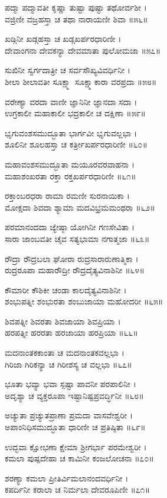 ಪದ್ಮಾ ಪದ್ಮಾವತೀ ಕೃಷ್ಣಾ ತುಷ್ಟಾ ಪುಷ್ಟಾ ತಥೋರ್ವಶೀ ।\\
ವಜ್ರಿಣೀ ವಜ್ರಹಸ್ತಾ ಚ ತಥಾ ನಾರಾಯಣೀ ಶಿವಾ ॥೫೬॥

ಖಡ್ಗಿನೀ ಖಡ್ಗಹಸ್ತಾ ಚ ಖಡ್ಗಖರ್ಪರಧಾರಿಣೀ ।\\
ದೇವಾಂಗನಾ ದೇವಕನ್ಯಾ ದೇವಮಾತಾ ಪುಲೋಮಜಾ ॥೫೭॥

ಸುಖಿನೀ ಸ್ವರ್ಗದಾತ್ರೀ ಚ ಸರ್ವಸೌಖ್ಯವಿವರ್ಧಿನೀ ।\\
ಶೀಲಾ ಶೀಲಾವತೀ ಸೂಕ್ಷ್ಮಾ ಸೂಕ್ಷ್ಮಾಕಾರಾ ವರಪ್ರದಾ ॥೫೮॥

ವರೇಣ್ಯಾ ವರದಾ ವಾಣೀ ಜ್ಞಾನಿನೀ ಜ್ಞಾನದಾ ಸದಾ ।\\
ಉಗ್ರಕಾಲೀ ಮಹಾಕಾಲೀ ಭದ್ರಕಾಲೀ ಚ ದಕ್ಷಿಣಾ ॥೫೯॥

ಭೃಗುವಂಶಸಮುದ್ಭೂತಾ ಭಾರ್ಗವೀ ಭೃಗುವಲ್ಲಭಾ ।\\
ಶೂಲಿನೀ ಶೂಲಹಸ್ತಾ ಚ ಕರ್ತ್ರೀಖರ್ಪರಧಾರಿಣೀ ॥೬೦॥

ಮಹಾವಂಶಸಮುದ್ಭೂತಾ ಮಯೂರವರವಾಹನಾ ।\\
ಮಹಾಶಂಖರತಾ ರಕ್ತಾ ರಕ್ತಖರ್ಪರಧಾರಿಣೀ ॥೬೧॥

ರಕ್ತಾಂಬರಧರಾ ರಾಮಾ ರಮಣೀ ಸುರನಾಯಿಕಾ ।\\
ಮೋಕ್ಷದಾ ಶಿವದಾ ಶ್ಯಾಮಾ ಮದವಿಭ್ರಮಮಂಥರಾ ॥೬೨॥

ಪರಮಾನಂದದಾ ಜ್ಯೇಷ್ಠಾ ಯೋಗಿನೀ ಗಣಸೇವಿತಾ ।\\
ಸಾರಾ ಜಾಂಬವತೀ ಚೈವ ಸತ್ಯಭಾಮಾ ನಗಾತ್ಮಜಾ ॥೬೩॥

ರೌದ್ರಾ ರೌದ್ರಬಲಾ ಘೋರಾ ರುದ್ರಸಾರಾರುಣಾತ್ಮಿಕಾ ।\\
ರುದ್ರರೂಪಾ ಮಹಾರೌದ್ರೀ ರೌದ್ರದೈತ್ಯವಿನಾಶಿನೀ ॥೬೪॥

ಕೌಮಾರೀ ಕೌಶಿಕೀ ಚಂಡಾ ಕಾಲದೈತ್ಯವಿನಾಶಿನೀ ।\\
ಶಂಭುಪತ್ನೀ ಶಂಭುರತಾ ಶಂಬುಜಾಯಾ ಮಹೋದರೀ ॥೬೫॥

ಶಿವಪತ್ನೀ ಶಿವರತಾ ಶಿವಜಾಯಾ ಶಿವಪ್ರಿಯಾ ।\\
ಹರಪತ್ನೀ ಹರರತಾ ಹರಜಾಯಾ ಹರಪ್ರಿಯಾ ॥೬೬॥

ಮದನಾಂತಕಕಾಂತಾ ಚ ಮದನಾಂತಕವಲ್ಲಭಾ ।\\
ಗಿರಿಜಾ ಗಿರಿಕನ್ಯಾ ಚ ಗಿರೀಶಸ್ಯ ಚ ವಲ್ಲಭಾ ॥೬೭॥

ಭೂತಾ ಭವ್ಯಾ ಭವಾ ಸ್ಪಷ್ಟಾ ಪಾವನೀ ಪರಪಾಲಿನೀ ।\\
ಅದೃಶ್ಯಾ ಚ ವ್ಯಕ್ತರೂಪಾ ಇಷ್ಟಾನಿಷ್ಟಪ್ರವರ್ದ್ಧಿನೀ ॥೬೮॥

ಅಚ್ಯುತಾ ಪ್ರಚ್ಯುತಪ್ರಾಣಾ ಪ್ರಮದಾ ವಾಸವೇಶ್ವರೀ ।\\
ಅಪಾಂನಿಧಿಸಮುದ್ಭೂತಾ ಧಾರಿಣೀ ಚ ಪ್ರತಿಷ್ಠಿತಾ ॥೬೯॥

ಉದ್ಭವಾ ಕ್ಷೋಭಣಾ ಕ್ಷೇಮಾ ಶ್ರೀಗರ್ಭಾ ಪರಮೇಶ್ವರೀ ।\\
ಕಮಲಾ ಪುಷ್ಪದೇಹಾ ಚ ಕಾಮಿನೀ ಕಂಜಲೋಚನಾ ॥೭೦॥

ಶರಣ್ಯಾ ಕಮಲಾ ಪ್ರೀತಿರ್ವಿಮಲಾನಂದವರ್ಧಿನೀ ।\\
ಕಪರ್ದಿನೀ ಕರಾಲಾ ಚ ನಿರ್ಮಲಾ ದೇವರೂಪಿಣೀ ॥೭೧॥

